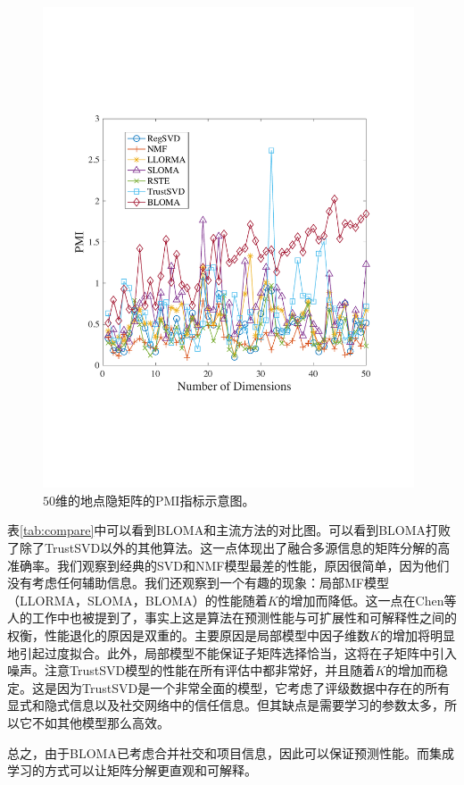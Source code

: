 \begin{figure}[!thb]
\centering
\includegraphics[width=110mm]{pics/pmi.pdf}
\caption{$50$维的地点隐矩阵的PMI指标示意图。} 
\label{pmi}
\end{figure}


表\ref{tab:compare}中可以看到BLOMA和主流方法的对比图。可以看到BLOMA打败了除了TrustSVD以外的其他算法。这一点体现出了融合多源信息的矩阵分解的高准确率。我们观察到经典的SVD和NMF模型最差的性能，原因很简单，因为他们没有考虑任何辅助信息。我们还观察到一个有趣的现象：局部MF模型（LLORMA，SLOMA，BLOMA）的性能随着$K$的增加而降低。这一点在Chen等人的工作中也被提到了，事实上这是算法在预测性能与可扩展性和可解释性之间的权衡，性能退化的原因是双重的。主要原因是局部模型中因子维数$K$的增加将明显地引起过度拟合。此外，局部模型不能保证子矩阵选择恰当，这将在子矩阵中引入噪声。注意TrustSVD模型的性能在所有评估中都非常好，并且随着$ K $的增加而稳定。这是因为TrustSVD是一个非常全面的模型，它考虑了评级数据中存在的所有显式和隐式信息以及社交网络中的信任信息。但其缺点是需要学习的参数太多，所以它不如其他模型那么高效。

总之，由于BLOMA已考虑合并社交和项目信息，因此可以保证预测性能。而集成学习的方式可以让矩阵分解更直观和可解释。



